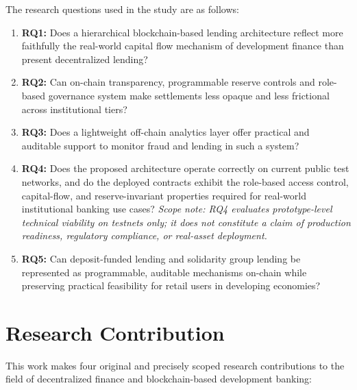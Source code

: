 \documentclass[12pt,a4paper]{report}
\begin{document}
The research questions used in the study are as follows:

\begin{enumerate}[noitemsep]
\item \textbf{RQ1:} Does a hierarchical blockchain-based lending architecture reflect more faithfully the real-world capital flow mechanism of development finance than present decentralized lending?
\item \textbf{RQ2:} Can on-chain transparency, programmable reserve controls and role-based governance system make settlements less opaque and less frictional across institutional tiers?
\item \textbf{RQ3:} Does a lightweight off-chain analytics layer offer practical and auditable support to monitor fraud and lending in such a system?
\item \textbf{RQ4:} Does the proposed architecture operate correctly on current public test networks, and do the deployed contracts exhibit the role-based access control, capital-flow, and reserve-invariant properties required for real-world institutional banking use cases? \textit{Scope note: RQ4 evaluates prototype-level technical viability on testnets only; it does not constitute a claim of production readiness, regulatory compliance, or real-asset deployment.}
\item \textbf{RQ5:} Can deposit-funded lending and solidarity group lending be represented as programmable, auditable mechanisms on-chain while preserving practical feasibility for retail users in developing economies?
\end{enumerate}

\section{Research Contribution}
\label{sec:research-contribution}

This work makes four original and precisely scoped research contributions to the field of decentralized finance and blockchain-based development banking:
\end{document}
